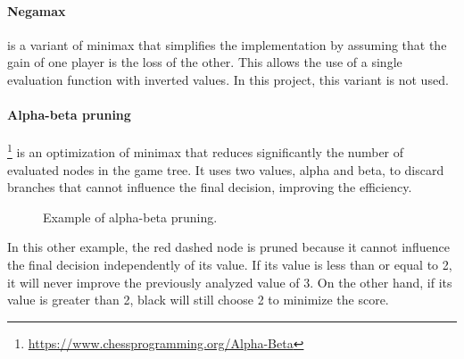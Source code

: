\paragraph{Negamax} is a variant of minimax that simplifies the implementation by assuming that the gain of one player is the loss of the other. This allows the use of a single evaluation function with inverted values. In this project, this variant is not used.

\paragraph{Alpha-beta pruning}\footnote{\url{https://www.chessprogramming.org/Alpha-Beta}} is an optimization of minimax that reduces significantly the number of evaluated nodes in the game tree. It uses two values, alpha and beta, to discard branches that cannot influence the final decision, improving the efficiency.

\begin{figure}[H]
    \centering
    \caption{Example of alpha-beta pruning.}
    \label{fig:alpha-beta-pruning}
\end{figure}

\noindent In this other example, the red dashed node is pruned because it cannot influence the final decision independently of its value. If its value is less than or equal to 2, it will never improve the previously analyzed value of 3. On the other hand, if its value is greater than 2, black will still choose 2 to minimize the score.


